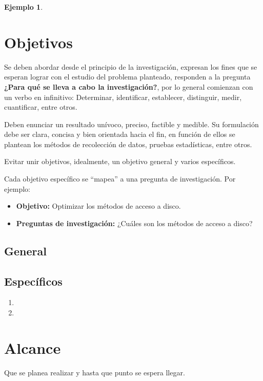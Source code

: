 \documentclass[letter,12pt]{report}
\newcommand\naranjo[1]{\textcolor[rgb]{1.00,0.36,0.06}{\textbf{#1}}}
\newtheorem{ejemplo}{Ejemplo}
\begin{document}
\begin{ejemplo}
\blindtext %
\end{ejemplo}


\section{Objetivos}\label{objetivos}

Se deben abordar desde el principio de la investigación, expresan los fines que se esperan lograr con el estudio del problema planteado, responden a la pregunta \naranjo{¿Para qué se lleva a cabo la investigación?}, por lo general comienzan con un verbo en infinitivo: Determinar, identificar, establecer, distinguir, medir, cuantificar, entre otros.

Deben enunciar un resultado unívoco, preciso, factible y medible. Su formulación debe ser clara, concisa y bien orientada hacia el fin, en función de ellos se plantean los métodos de recolección de datos, pruebas estadísticas, entre otros.

Evitar unir objetivos, idealmente, un objetivo general y varios específicos.

Cada objetivo específico se ``mapea'' a una pregunta de investigación.
Por ejemplo:
  \begin{itemize}
  \item \textbf{\naranjo{Objetivo:}} Optimizar los métodos de acceso a disco.
  \item \textbf{\naranjo{Preguntas de investigación:}} ¿Cuáles son los métodos de acceso a disco?
\end{itemize}
\subsection{General}
\blindtext %

\subsection{Específicos}
\begin{enumerate}\justifying
  \item \blindtext %
 
  \item \blindtext %

\end{enumerate}

\section{Alcance}
Que se planea realizar y hasta que punto se espera llegar.
\end{document}

